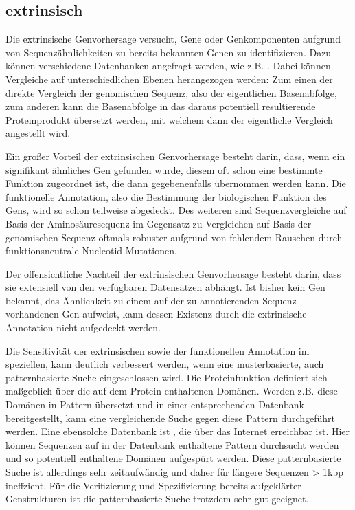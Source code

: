 \subsection{extrinsisch}
Die extrinsische Genvorhersage versucht, Gene oder Genkomponenten aufgrund von
Sequenzähnlichkeiten zu bereits bekannten Genen zu identifizieren.
Dazu können verschiedene Datenbanken angefragt werden, wie z.B. .
Dabei können Vergleiche auf unterschiedlichen Ebenen herangezogen werden:
Zum einen der direkte Vergleich der genomischen Sequenz, also der eigentlichen
Basenabfolge, zum anderen kann die Basenabfolge in das daraus potentiell
resultierende Proteinprodukt übersetzt werden, mit welchem dann der eigentliche
Vergleich angestellt wird.

Ein großer Vorteil der extrinsischen Genvorhersage besteht darin, dass, wenn ein
signifikant ähnliches Gen gefunden wurde, diesem oft schon eine bestimmte
Funktion zugeordnet ist, die dann gegebenenfalls übernommen werden kann.
Die funktionelle Annotation, also die Bestimmung der biologischen Funktion des
Gens, wird so schon teilweise abgedeckt.
Des weiteren sind Sequenzvergleiche auf Basis der Aminosäuresequenz im
Gegensatz zu Vergleichen auf Basis der genomischen Sequenz oftmals robuster
aufgrund von fehlendem Rauschen durch funktionsneutrale Nucleotid-Mutationen.

Der offensichtliche Nachteil der extrinsischen Genvorhersage besteht darin, dass
sie extensiell von den verfügbaren Datensätzen abhängt.
Ist bisher kein Gen bekannt, das Ähnlichkeit zu einem auf der zu annotierenden
Sequenz vorhandenen Gen aufweist, kann dessen Existenz durch die extrinsische
Annotation nicht aufgedeckt werden.

Die Sensitivität der extrinsischen sowie der funktionellen Annotation im
speziellen, kann deutlich verbessert werden, wenn eine musterbasierte, auch
patternbasierte Suche eingeschlossen wird.
Die Proteinfunktion definiert sich maßgeblich über die auf dem Protein
enthaltenen Domänen.
Werden z.B. diese Domänen in Pattern übersetzt und in einer entsprechenden
Datenbank bereitgestellt, kann eine vergleichende Suche gegen diese Pattern
durchgeführt werden.
Eine ebensolche Datenbank ist , die über das Internet
erreichbar ist.
Hier können Sequenzen auf in der Datenbank enthaltene Pattern
durchsucht werden und so potentiell enthaltene Domänen aufgespürt werden.
Diese patternbasierte Suche ist allerdings sehr zeitaufwändig und daher für
längere Sequenzen > 1kbp ineffzient.
Für die Verifizierung und Spezifizierung bereits aufgeklärter Genstrukturen ist
die patternbasierte Suche trotzdem sehr gut geeignet.
\citep{pmid16749184}